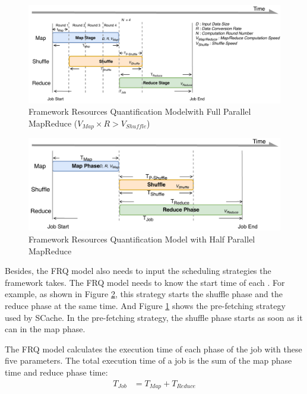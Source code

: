 {\begin{figure}
    \centering
	\includegraphics[width=\linewidth]{fig/model_basic}
	\caption{\color{black}Framework Resources Quantification Model\newline with Full Parallel MapReduce (\(V_{Map} \times R > V_{Shuffle}\))}
    \label{fig:model_basic}
\end{figure}
\begin{figure}
	\centering
	\includegraphics[width=\linewidth]{fig/model_hadoop}
	\caption{\color{black}Framework Resources Quantification Model with Half Parallel MapReduce}
	\label{fig:model_hadoop}
\end{figure}

{\color{black}
Besides, the FRQ model also needs to input the scheduling strategies the framework takes.
The FRQ model needs to know the start time of each .
For example, as shown in Figure \ref{fig:model_hadoop}, this strategy starts the shuffle phase and the reduce phase at the same time.
And Figure \ref{fig:model_basic} shows the pre-fetching strategy used by SCache. In the pre-fetching strategy, the shuffle phase starts as soon as it can in the map phase.
}

The FRQ model calculates the execution time of each phase of the job with these five parameters.
The total execution time of a job is the sum of the map phase time and reduce phase time:
\begin{equation}
\label{equation_Tjob}
\begin{aligned}
    T_{Job} &= T_{Map} + T_{Reduce}
\end{aligned}
\end{equation}

}
